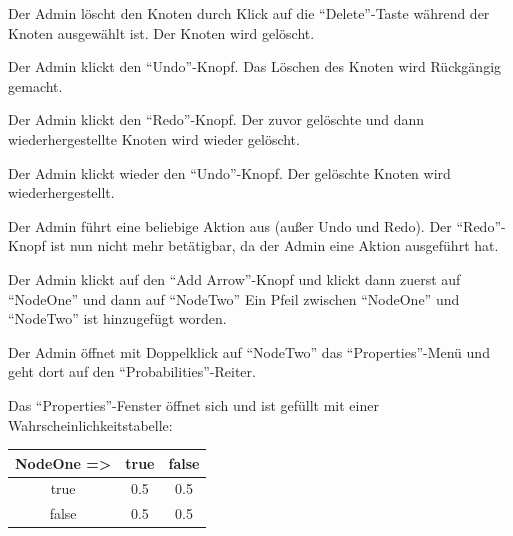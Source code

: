 \documentclass[parskip=full,11pt,twoside]{scrartcl}
\begin{document}

{Der Admin löscht den Knoten durch Klick auf die \enquote{Delete}-Taste während der Knoten ausgewählt ist.}
{Der Knoten wird gelöscht.}

{Der Admin klickt den \enquote{Undo}-Knopf.}
{Das Löschen des Knoten wird Rückgängig gemacht.}

{Der Admin klickt den \enquote{Redo}-Knopf.}
{Der zuvor gelöschte und dann wiederhergestellte Knoten wird wieder gelöscht.}

{Der Admin klickt wieder den \enquote{Undo}-Knopf.}
{Der gelöschte Knoten wird wiederhergestellt.}

{Der Admin führt eine beliebige Aktion aus (außer Undo und Redo).}
{Der \enquote{Redo}-Knopf ist nun nicht mehr betätigbar, da der Admin eine Aktion ausgeführt hat.}


{Der Admin klickt auf den \enquote{Add Arrow}-Knopf und klickt dann zuerst auf \enquote{NodeOne} und dann auf \enquote{NodeTwo}}
{Ein Pfeil zwischen \enquote{NodeOne} und \enquote{NodeTwo} ist hinzugefügt worden.}

{Der Admin öffnet mit Doppelklick auf \enquote{NodeTwo} das \enquote{Properties}-Menü und geht dort auf den \enquote{Probabilities}-Reiter.}
{Das \enquote{Properties}-Fenster öffnet sich und ist gefüllt mit einer Wahrscheinlichkeitstabelle:
\begin{tabular}{c || c | c}
    NodeOne => & true & false \\
    \hline
    true & 0.5 & 0.5 \\
    false & 0.5 & 0.5
\end{tabular}}
\end{document}
